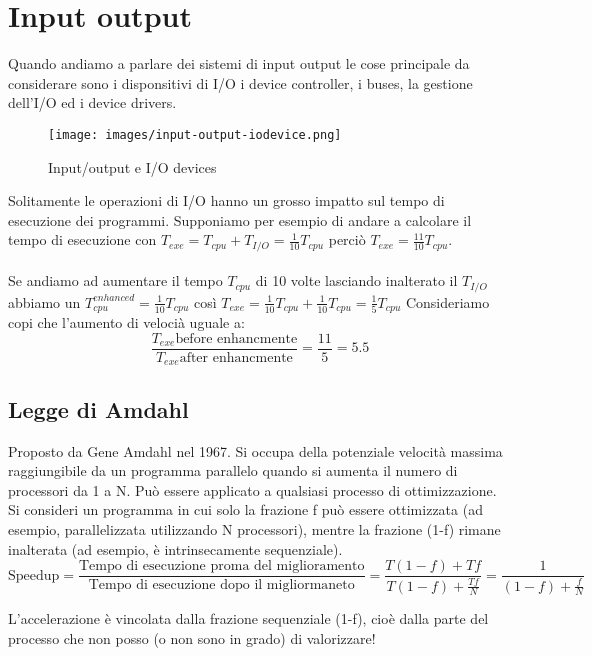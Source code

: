 \newpage
\section{Input output}
Quando andiamo a parlare dei sistemi di input output le cose principale da considerare sono i 
disponsitivi di I/O i device controller, i buses, la gestione dell'I/O ed i device drivers.

\begin{figure}[!h]
    \centering
    \texttt{[image: images/input-output-iodevice.png]}
    \caption{Input/output e I/O devices}
\end{figure}

\hspace{-15pt}Solitamente le operazioni di I/O hanno un grosso impatto sul tempo di esecuzione dei programmi.
Supponiamo per esempio di andare a calcolare il tempo di esecuzione con \(T_{exe} = T_{cpu} + T_{I/O} = \frac{1}{10}T_{cpu}\) perciò
\(T_{exe} = \frac{11}{10}T_{cpu}\).\\\\
\hspace{-15pt}Se andiamo ad aumentare il tempo \(T_{cpu}\) di 10 volte lasciando inalterato il \(T_{I/O}\) abbiamo
un \(T_{cpu}^{enhanced} = \frac{1}{10} T_{cpu}\) così \(T_{exe} = \frac{1}{10}T_{cpu} + \frac{1}{10}T_{cpu} = \frac{1}{5}T_{cpu}\)
Consideriamo copi che l'aumento di velocià uguale a: \[\frac{T_{exe} \text{before enhancmente}}{T_{exe} \text{after enhancmente}} = \frac{11}{5} = 5.5\]

\subsection{Legge di Amdahl}
Proposto da Gene Amdahl nel 1967. Si occupa della potenziale velocità massima raggiungibile da un programma parallelo quando si aumenta il numero di processori da 1 a N.
Può essere applicato a qualsiasi processo di ottimizzazione. 
Si consideri un programma in cui solo la frazione f può essere ottimizzata (ad esempio, parallelizzata utilizzando N processori), mentre la frazione (1-f) rimane inalterata (ad esempio, è intrinsecamente sequenziale).
\[\text{Speedup} = \frac{\text{Tempo di esecuzione proma del miglioramento}}{\text{Tempo di esecuzione dopo il migliormaneto}} = \frac{T(1- f) + Tf}{T(1 - f) + \frac{Tf}{N}} = \frac{1}{(1 - f) + \frac{f}{N}}\]

\begin{observation}
    L'accelerazione è vincolata dalla frazione sequenziale (1-f), cioè dalla parte del processo che non posso (o non sono in grado) di valorizzare!
\end{observation}

